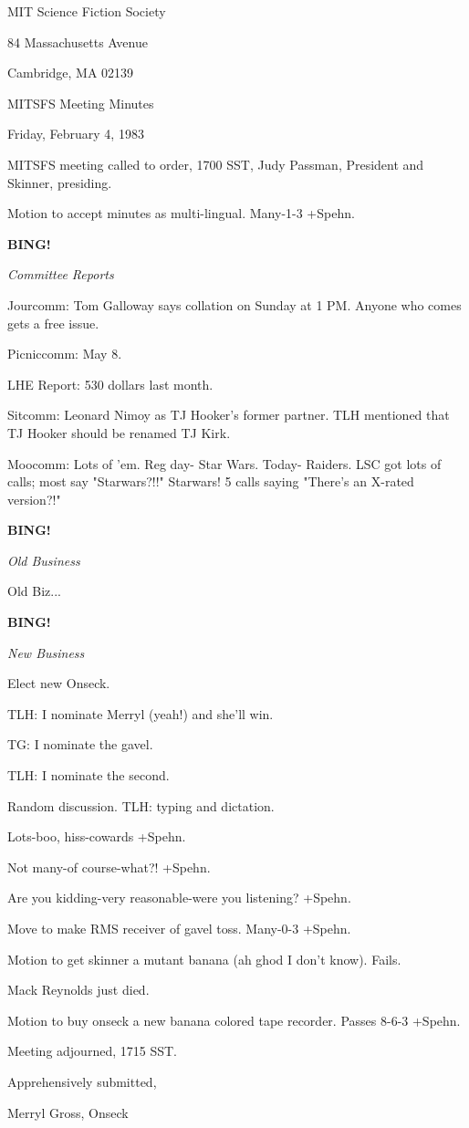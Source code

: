 \documentclass[12pt]{article}
\newcommand{\bing}{{\bf BING!} }
\newcommand{\goto}[1]{\bing \vskip 12pt \centerline{{\em{#1}}}}
\begin{document}
\begin{center}

MIT Science Fiction Society 

84 Massachusetts Avenue

Cambridge, MA 02139

\vspace{12pt}

MITSFS Meeting Minutes 

Friday, February 4, 1983

\end{center}
 
\vspace{18pt}

\setlength{\parskip}{6pt}

\noindent
MITSFS meeting called to order, 1700 SST,
Judy Passman, President and Skinner, presiding.

Motion to accept minutes as multi-lingual. Many-1-3 +Spehn.

\goto{Committee Reports}

Jourcomm: Tom Galloway says collation on Sunday at 1 PM. Anyone who comes gets a free issue.

Picniccomm: May 8.

LHE Report: 530 dollars last month.

Sitcomm: Leonard Nimoy as TJ Hooker's former partner. TLH mentioned that TJ Hooker should be renamed TJ Kirk.

Moocomm: Lots of 'em. Reg day- Star Wars. Today- Raiders. LSC got lots of calls; most say "Starwars?!!" Starwars! 5 calls saying "There's an X-rated version?!"

\goto{Old Business}

Old Biz...

\goto{New Business}

Elect new Onseck.

TLH: I nominate Merryl (yeah!) and she'll win.

TG: I nominate the gavel.

TLH: I nominate the second.

Random discussion. TLH: typing and dictation.

Lots-boo, hiss-cowards +Spehn.

Not many-of course-what?! +Spehn.

Are you kidding-very reasonable-were you listening? +Spehn.

Move to make RMS receiver of gavel toss. Many-0-3 +Spehn.

Motion to get skinner a mutant banana (ah ghod I don't know). Fails.

Mack Reynolds just died.

Motion to buy onseck a new banana colored tape recorder. Passes 8-6-3 +Spehn.

\vspace{12pt}

\noindent
Meeting adjourned, 1715 SST.

\vspace{18pt}

\centerline{Apprehensively submitted,}
\centerline{Merryl Gross, Onseck}
\end{document}
